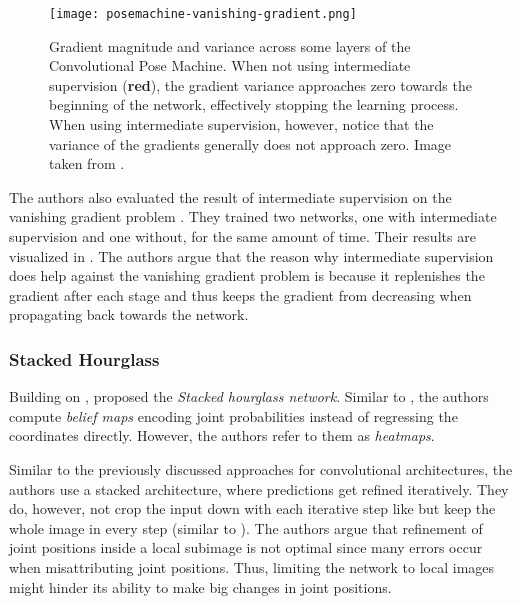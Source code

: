 \begin{figure}[htb!]
    \centering
    \texttt{[image: posemachine-vanishing-gradient.png]}
    \caption{Gradient magnitude and variance across some layers of the Convolutional Pose Machine. When not using intermediate supervision (\textbf{red}), the gradient variance approaches zero towards the beginning of the network, effectively stopping the learning process.  When using intermediate supervision, however, notice that the variance of the gradients generally does not approach zero. Image taken from \cite{wei_convolutional_2016}.}
    \label{fig:pose-machine-vanishing-gradient}
\end{figure}

The authors also evaluated the result of intermediate supervision on the vanishing gradient problem . 
They trained two networks, one with intermediate supervision and one without, for the same amount of time.
Their results are visualized in .
The authors argue that the reason why intermediate supervision does help against the vanishing gradient problem is because it replenishes the gradient after each stage and thus keeps the gradient from decreasing when propagating back towards the network.

\subsubsection{Stacked Hourglass}

Building on \cite{toshev_deeppose:_2014}, \cite{newell_stacked_2016} proposed the \textit{Stacked hourglass network}.
Similar to \cite{wei_convolutional_2016}, the authors compute \textit{belief maps} encoding joint probabilities instead of regressing the coordinates directly.
However, the authors refer to them as \textit{heatmaps}.

Similar to the previously discussed approaches for convolutional architectures, the authors use a stacked architecture, where predictions get refined iteratively.
They do, however, not crop the input down with each iterative step like \cite{toshev_deeppose:_2014} but keep the whole image in every step (similar to \cite{wei_convolutional_2016}).
The authors argue that refinement of joint positions inside a local subimage is not optimal since many errors occur when misattributing joint positions.
Thus, limiting the network to local images might hinder its ability to make big changes in joint positions.

